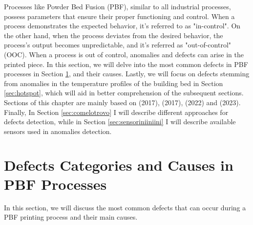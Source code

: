 Processes like Powder Bed Fusion (PBF), similar to all industrial processes, possess parameters that ensure their proper functioning and control. When a process demonstrates the expected behavior, it's referred to as "in-control". On the other hand, when the process deviates from the desired behavior, the process's output becomes unpredictable, and it's referred as "out-of-control" (OOC). When a process is out of control, anomalies and defects can arise in the printed piece. In this section, we will delve into the most common defects in PBF processes in Section \ref{sec:defects}, and their causes. Lastly, we will focus on defects stemming from anomalies in the temperature profiles of the building bed in Section \ref{sec:hotspot}, which will aid in better comprehension of the subsequent sections. Sections of this chapter are mainly based on \citeauthor{grasso_-process_2017} (2017), \citeauthor{grasso_process_2017} (2017), \citeauthor{mostafaei_defects_2022} (2022) and \citeauthor{wu_additively_2023} (2023). Finally, In Section \ref{sec:comelotrovo} I will describe different approaches for defects detection, while in Section \ref{sec:sensoriniiniini} I will describe available sensors used in anomalies detection. 

\section{Defects Categories and Causes in PBF Processes}
\label{sec:defects}
In this section, we will discuss the most common defects that can occur during a PBF printing process and their main causes.
